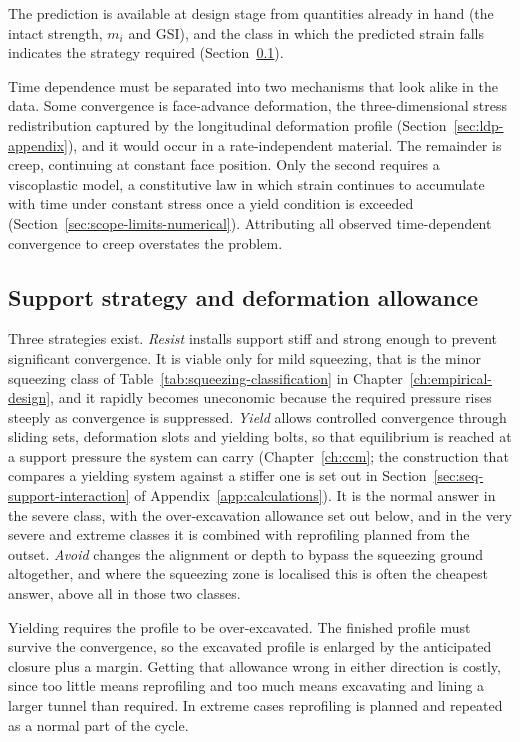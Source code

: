 The prediction is available at design stage from
quantities already in hand (the intact strength, $m_i$ and GSI), and
the class in which the predicted strain falls indicates the strategy
required (Section~\ref{sec:squeezing-strategy}).

Time dependence must be separated into two mechanisms that look alike in the
data. Some convergence is face-advance deformation, the
three-dimensional stress redistribution captured by the longitudinal
deformation profile (Section~\ref{sec:ldp-appendix}), and it would occur in
a rate-independent material. The
remainder is creep, continuing at constant face position. Only the
second requires a viscoplastic model, a constitutive law in which strain
continues to accumulate with time under constant stress once a yield condition
is exceeded (Section~\ref{sec:scope-limits-numerical}). Attributing all observed
time-dependent convergence to creep overstates the problem.

\subsection{Support strategy and deformation allowance}
\label{sec:squeezing-strategy}

Three strategies exist. \emph{Resist} installs support stiff and strong enough
to prevent significant convergence. It is viable only for mild squeezing, that
is the minor squeezing class of
Table~\ref{tab:squeezing-classification} in Chapter~\ref{ch:empirical-design},
and it rapidly becomes uneconomic because the required pressure rises steeply as
convergence is suppressed. \emph{Yield} allows controlled convergence through
sliding sets, deformation slots and yielding bolts, so that equilibrium is
reached at a support pressure the system can carry
(Chapter~\ref{ch:ccm}; the construction that compares a yielding system against a stiffer one is set out in Section~\ref{sec:seq-support-interaction} of Appendix~\ref{app:calculations}).
It is the normal answer in the severe class, with the over-excavation
allowance set out below, and in the very severe and extreme classes it is
combined with reprofiling planned from the outset. \emph{Avoid} changes the alignment or depth to bypass
the squeezing ground altogether, and where the squeezing zone is localised
this is often the cheapest answer, above all in those two classes.

Yielding requires the profile to be over-excavated. The finished profile must
survive the convergence, so the excavated profile is enlarged by the
anticipated closure plus a margin. Getting that allowance wrong in
either direction is costly, since too little means reprofiling and too much
means excavating and lining a larger tunnel than required. In extreme cases
reprofiling is planned and repeated as a normal part of the cycle.

